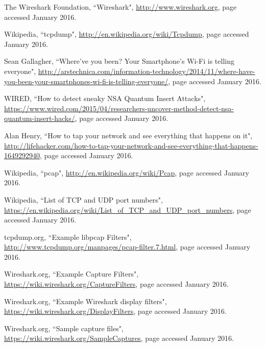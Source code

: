 \documentclass[12pt]{extarticle}
\begin{document}
\begin{thebibliography}{9}

	The Wireshark Foundation, ``Wireshark", \url{http://www.wireshark.org}, page accessed January 2016.
	
    Wikipedia, ``tcpdump", \url{http://en.wikipedia.org/wiki/Tcpdump}, page accessed January 2016.
    
Sean Gallagher, ``Where've you been? Your Smartphone's Wi-Fi is telling everyone", \url{http://arstechnica.com/information-technology/2014/11/where-have-you-been-your-smartphones-wi-fi-is-telling-everyone/}, page accessed January 2016.

WIRED, ``How to detect sneaky NSA Quantum Insert Attacks", \url{https://www.wired.com/2015/04/researchers-uncover-method-detect-nsa-quantum-insert-hacks/}, page accessed January 2016.

Alan Henry, ``How to tap your network and see everything that happens on it", \url{http://lifehacker.com/how-to-tap-your-network-and-see-everything-that-happens-1649292940}, page accessed January 2016.

Wikipedia, ``pcap", \url{http://en.wikipedia.org/wiki/Pcap}, page accessed January 2016.
    
Wikipedia, ``{List of TCP and UDP port numbers}", \url{https://en.wikipedia.org/wiki/List_of_TCP_and_UDP_port_numbers}, page accessed January 2016.

tcpdump.org, ``{Example libpcap Filters}", \url{http://www.tcpdump.org/manpages/pcap-filter.7.html}, page accessed January 2016.

Wireshark.org, ``{Example Capture Filters}", \url{https://wiki.wireshark.org/CaptureFilters}, page accessed January 2016.

Wireshark.org, ``{Example Wireshark display filters}", \url{https://wiki.wireshark.org/DisplayFilters}, page accessed January 2016.


Wireshark.org, ``{Sample capture files}", \url{https://wiki.wireshark.org/SampleCaptures}, page accessed January 2016.

\end{thebibliography}
\end{document}
